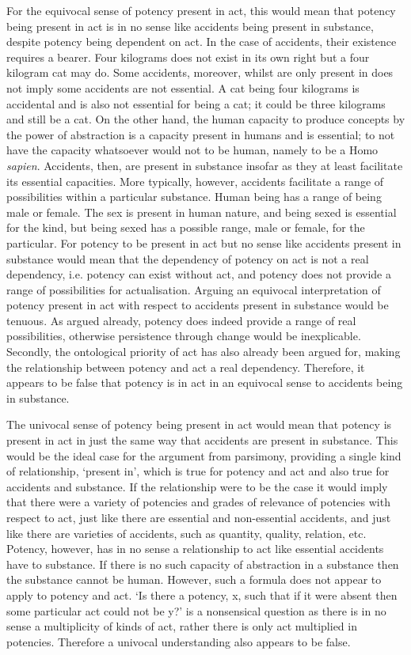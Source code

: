 For the equivocal sense of potency present in act, this would mean that potency being present in act is in no sense like accidents being present in substance, despite potency being dependent on act. In the case of accidents, their existence requires a bearer. Four kilograms does not exist in its own right but a four kilogram cat may do. Some accidents, moreover, whilst are only present in does not imply some accidents are not essential. A cat being four kilograms is accidental and is also not essential for being a cat; it could be three kilograms and still be a cat. On the other hand, the human capacity to produce concepts by the power of abstraction is a capacity present in humans and is essential; to not have the capacity whatsoever would not to be human, namely to be a Homo \emph{sapien}.  Accidents, then, are present in substance insofar as they at least facilitate its essential capacities. More typically, however, accidents facilitate a range of possibilities within a particular substance. Human being has a range of being male or female. The sex is present in human nature, and being sexed is essential for the kind, but being sexed has a possible range, male or female, for the particular. For potency to be present in act but no sense like accidents present in substance would mean that the dependency of potency on act is not a real dependency, i.e. potency can exist without act, and potency does not provide a range of possibilities for actualisation. Arguing an equivocal interpretation of potency present in act with respect to accidents present in substance would be tenuous. As argued already, potency does indeed provide a range of real possibilities, otherwise persistence through change would be inexplicable. Secondly, the ontological priority of act has also already been argued for, making the relationship between potency and act a real dependency. Therefore, it appears to be false that potency is in act in an equivocal sense to accidents being in substance.

The univocal sense of potency being present in act would mean that potency is present in act in just the same way that accidents are present in substance. This would be the ideal case for the argument from parsimony, providing a single kind of relationship, `present in', which is true for potency and act and also true for accidents and substance. If the relationship were to be the case it would imply that there were a variety of potencies and grades of relevance of potencies with respect to act, just like there are essential and non-essential accidents, and just like there are varieties of accidents, such as quantity, quality, relation, etc. Potency, however, has in no sense a relationship to act like essential accidents have to substance. If there is no such capacity of abstraction in a substance then the substance cannot be human. However, such a formula does not appear to apply to potency and act. `Is there a potency, x, such that if it were absent then some particular act could not be y?' is a nonsensical question as there is in no sense a multiplicity of kinds of act, rather there is only act multiplied in potencies. Therefore a univocal understanding also appears to be false.


